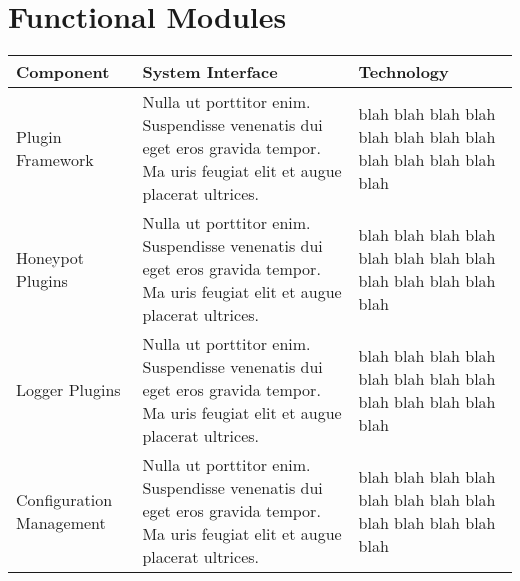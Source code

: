 \section*{\color{NavyBlue}Functional Modules}

\begin{center}
\begin{tabularx}{\linewidth}{X | X | X}
\toprule
\textbf{Component} & \textbf{System Interface} & \textbf{Technology} \\
\midrule
Plugin Framework & Nulla ut porttitor enim. Suspendisse venenatis dui eget eros gravida tempor. Ma uris feugiat elit et augue placerat ultrices. &  blah blah blah blah blah blah blah blah blah blah blah blah blah \\ \hline
Honeypot Plugins & Nulla ut porttitor enim. Suspendisse venenatis dui eget eros gravida tempor. Ma uris feugiat elit et augue placerat ultrices. &  blah blah blah blah blah blah blah blah blah blah blah blah blah \\ \hline
Logger Plugins & Nulla ut porttitor enim. Suspendisse venenatis dui eget eros gravida tempor. Ma uris feugiat elit et augue placerat ultrices. &  blah blah blah blah blah blah blah blah blah blah blah blah blah \\ \hline
Configuration Management & Nulla ut porttitor enim. Suspendisse venenatis dui eget eros gravida tempor. Ma uris feugiat elit et augue placerat ultrices. &  blah blah blah blah blah blah blah blah blah blah blah blah blah \\
\bottomrule
\end{tabularx}
\end{center}
